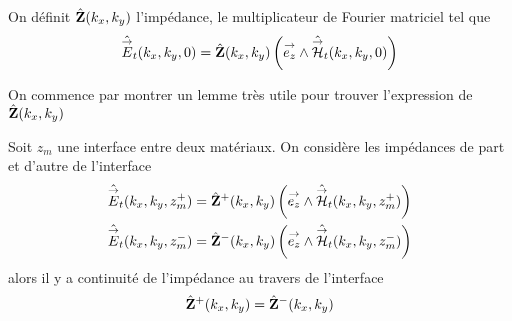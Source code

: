 
        \begin{defn}
            \label{def:plan:impedace}
            On définit \(\hat {\mathbf{Z}}(k_x,k_y)\) l'impédance, le multiplicateur de Fourier matriciel tel que
            \begin{equation*}
                \hat {{\overset{\rightarrow}{E}}}_t(k_x,k_y,0) = \hat {\mathbf{Z}}(k_x,k_y) \left({\overset{\rightarrow}{e_z}} \wedge \hat {{\overset{\rightarrow}{\mathcal{H}}}}_t(k_x,k_y,0)\right)
            \end{equation*}
        \end{defn}

        On commence par montrer un lemme très utile pour trouver l'expression de \(\hat {\mathbf{Z}}(k_x,k_y)\)
        \begin{lemme}
            \label{lem:plan:continuite_impedance}
            Soit \(z_m\) une interface entre deux matériaux. On considère les impédances de part et d'autre de l'interface
            \begin{align*}
                \hat{{\overset{\rightarrow}{E}}}_t(k_x,k_y,z_m^+) &= \hat{\mathbf{Z}}^+(k_x,k_y) \left({\overset{\rightarrow}{e_z}} \wedge \hat{{\overset{\rightarrow}{\mathcal{H}}}}_t(k_x,k_y,z_m^+)\right)
                \\
                \hat{{\overset{\rightarrow}{E}}}_t(k_x,k_y,z_m^-) &= \hat{\mathbf{Z}}^-(k_x,k_y) \left({\overset{\rightarrow}{e_z}} \wedge \hat{{\overset{\rightarrow}{\mathcal{H}}}}_t(k_x,k_y,z_m^-)\right)
            \end{align*}
            alors il y a continuité de l'impédance au travers de l'interface
            \begin{equation*}
            \hat {\mathbf{Z}}^+(k_x,k_y) = \hat {\mathbf{Z}}^-(k_x,k_y)
            \end{equation*}
        \end{lemme}
